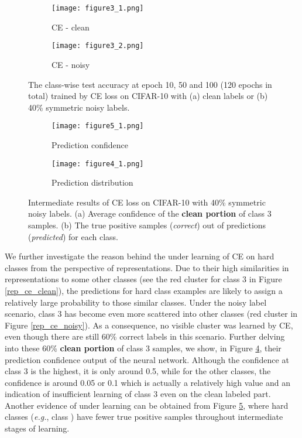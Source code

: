 \documentclass[10pt,twocolumn,letterpaper]{article}
\begin{document}
\begin{figure}[!t]
	\centering
	\begin{subfigure}{0.49\linewidth}
		\texttt{[image: figure3\_1.png]}
		\caption{CE - clean}
		\label{acc_ce_clean}
	\end{subfigure}
	\begin{subfigure}{0.49\linewidth} 
		\texttt{[image: figure3\_2.png]}
		\caption{CE - noisy} 
		\label{acc_ce_noisy}
	\end{subfigure}
	\vspace{-0.1 in}
	\caption{The class-wise test accuracy at epoch 10, 50 and 100 (120 epochs in total) trained by CE loss on CIFAR-10 with (a) clean labels or (b) 40\% symmetric noisy labels.}
	\label{fig:biased_class_test_acc}
	\vspace{-0.1 in}
\end{figure}

\begin{figure}[!t]
	\centering
	\begin{subfigure}{0.49\linewidth}
		\texttt{[image: figure5\_1.png]}
		\caption{Prediction confidence}
		\label{ce_confidence}
	\end{subfigure}
	\begin{subfigure}{0.49\linewidth} 
		\texttt{[image: figure4\_1.png]}
		\caption{Prediction distribution} 
		\label{pred_imbalance}
	\end{subfigure}
	\vspace{-0.1 in}
	\caption{Intermediate results of CE loss on CIFAR-10 with 40\% symmetric noisy labels. (a) Average confidence of the \textbf{clean portion} of class 3 samples. (b) The true positive samples (\emph{correct}) out of predictions (\emph{predicted}) for each class.}
	\label{inner_ce}
	\vspace{-0.15 in}
\end{figure}

We further investigate the reason behind the under learning of CE on hard classes from the perspective of representations. Due to their high similarities in representations to some other classes (see the red cluster for class 3 in Figure \ref{rep_ce_clean}), the predictions for hard class examples are likely to assign a relatively large probability to those similar classes. 
Under the noisy label scenario, class 3 has become even more scattered into other classes (red cluster in Figure \ref{rep_ce_noisy}). As a consequence, no visible cluster was learned by CE, even though there are still 60\% correct labels in this scenario. Further delving into these 60\% \textbf{clean portion} of class 3 samples, we show, in Figure \ref{ce_confidence}, their prediction confidence output of the neural network. Although the confidence at class 3 is the highest, it is only around 0.5, while for the other classes, the confidence is around 0.05 or 0.1 which is actually a relatively high value and an indication of insufficient learning of class 3 even on the clean labeled part.
Another evidence of under learning can be obtained from Figure \ref{pred_imbalance}, where hard classes (\textit{e.g.}, class ) have fewer true positive samples throughout intermediate stages of learning.
\end{document}
